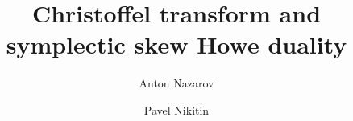 \documentclass[reqno,11pt]{amsart}
\theoremstyle{plain}
\theoremstyle{definition}
\numberwithin{equation}{section}
\begin{document}
\title{Christoffel transform and symplectic skew Howe duality}

  \author[A.~Nazarov]{Anton Nazarov}
  \address[A.~Nazarov] {Department of High Energy and Elementary
    Particle Physics, St.\ Petersburg State University, University
    Embankment, 7/9, St.\ Petersburg, Russia, 199034 and 
    Beijing Institute of Mathematical Sciences and Applications (BIMSA),
\textit{Beijing} 101408, People's Republic of China}

 \author[P.~Nikitin]{Pavel Nikitin}
 \address[P.~Nikitin]{%
   Beijing Institute of Mathematical Sciences and Applications (BIMSA),
   Beijing 101408, People's Republic of China}
 
\end{document}
